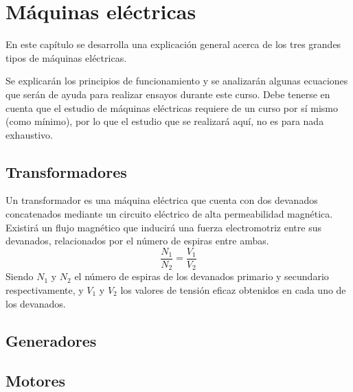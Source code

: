 \chapter{Máquinas eléctricas}
En este capítulo se desarrolla una explicación general acerca de los tres grandes tipos de máquinas eléctricas.

Se explicarán los principios de funcionamiento y se analizarán algunas ecuaciones que serán de ayuda para realizar ensayos durante este curso. Debe tenerse en cuenta que el estudio de máquinas eléctricas requiere de un curso por sí mismo (como mínimo), por lo que el estudio que se realizará aquí, no es para nada exhaustivo.

\section{Transformadores}

Un transformador es una máquina eléctrica que cuenta con dos devanados concatenados mediante un circuito eléctrico de alta permeabilidad magnética. Existirá un flujo magnético que inducirá una fuerza electromotriz entre sus devanados, relacionados por el número de espiras entre ambas.
\begin{equation}
	\label{eq:relacion_espiras_transformador}
	\frac{N_1}{N_2}=\frac{V_1}{V_2}
\end{equation}
Siendo $N_1$ y $N_2$ el número de espiras de los devanados primario y secundario respectivamente, y $V_1$ y $V_2$ los valores de tensión eficaz obtenidos en cada uno de los devanados.
\section{Generadores}
\section{Motores}
